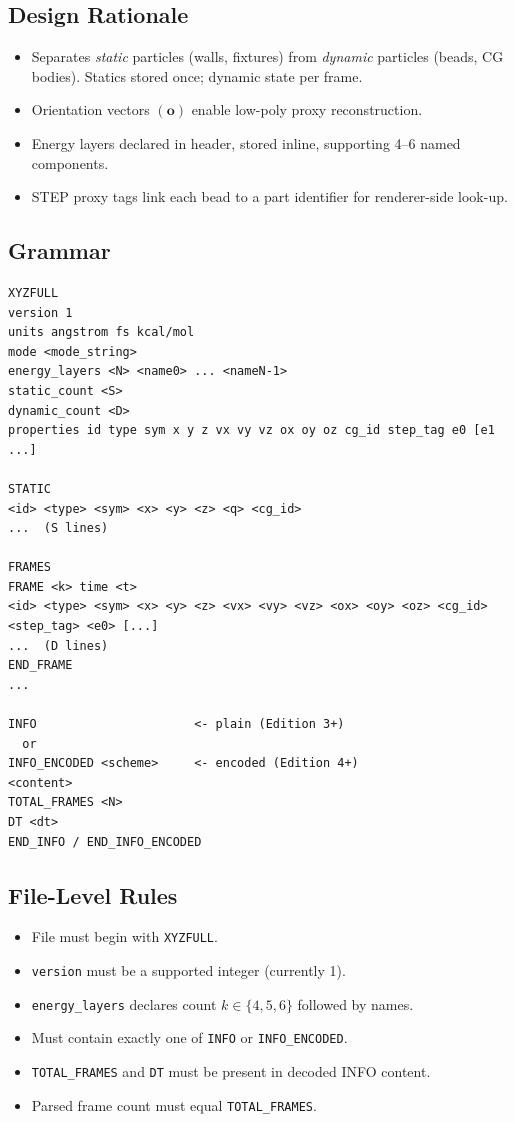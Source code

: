 \documentclass[12pt, a4paper, oneside]{article}
\begin{document}
\subsection{Design Rationale}

\begin{itemize}
  \item Separates \emph{static} particles (walls, fixtures) from \emph{dynamic}
        particles (beads, CG bodies).  Statics stored once; dynamic state per frame.
  \item Orientation vectors $(\mathbf{o})$ enable low-poly proxy reconstruction.
  \item Energy layers declared in header, stored inline, supporting 4--6 named components.
  \item STEP proxy tags link each bead to a part identifier for renderer-side look-up.
\end{itemize}

\subsection{Grammar}

\begin{lstlisting}[language={},frame=single]
XYZFULL
version 1
units angstrom fs kcal/mol
mode <mode_string>
energy_layers <N> <name0> ... <nameN-1>
static_count <S>
dynamic_count <D>
properties id type sym x y z vx vy vz ox oy oz cg_id step_tag e0 [e1 ...]

STATIC
<id> <type> <sym> <x> <y> <z> <q> <cg_id>
...  (S lines)

FRAMES
FRAME <k> time <t>
<id> <type> <sym> <x> <y> <z> <vx> <vy> <vz> <ox> <oy> <oz> <cg_id> <step_tag> <e0> [...]
...  (D lines)
END_FRAME
...

INFO                      <- plain (Edition 3+)
  or
INFO_ENCODED <scheme>     <- encoded (Edition 4+)
<content>
TOTAL_FRAMES <N>
DT <dt>
END_INFO / END_INFO_ENCODED
\end{lstlisting}

\subsection{File-Level Rules}

\begin{itemize}
  \item File must begin with \texttt{XYZFULL}.
  \item \texttt{version} must be a supported integer (currently 1).
  \item \texttt{energy\_layers} declares count $k \in \{4,5,6\}$ followed by names.
  \item Must contain exactly one of \texttt{INFO} or \texttt{INFO\_ENCODED}.
  \item \texttt{TOTAL\_FRAMES} and \texttt{DT} must be present in decoded INFO content.
  \item Parsed frame count must equal \texttt{TOTAL\_FRAMES}.
\end{itemize}
\end{document}
